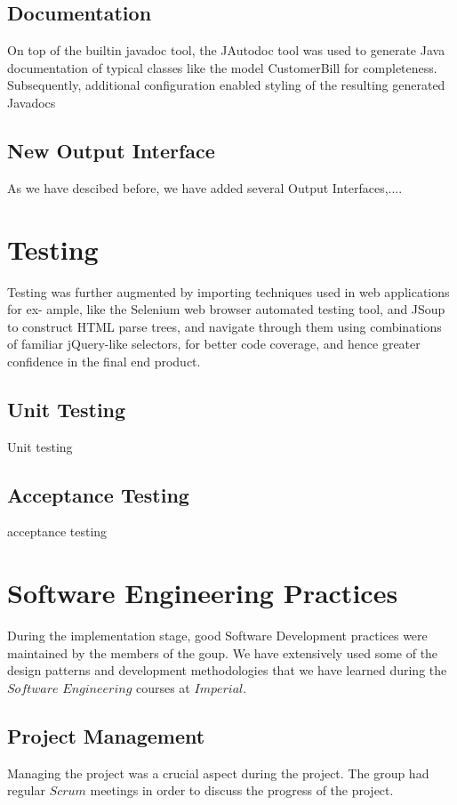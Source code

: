 \documentclass[11pt,twocolumn]{article} %
\begin{document}
\subsection{Documentation}
On top of the builtin javadoc tool, the JAutodoc tool was used to generate Java documentation of typical classes like the model CustomerBill for completeness.
Subsequently, additional configuration enabled styling of the resulting generated Javadocs

\subsection{New Output Interface}
As we have descibed before, we have added several Output Interfaces,....

\section{Testing}
Testing was further augmented by importing techniques used in web applications for ex-
ample, like the Selenium web browser automated testing tool, and JSoup to construct
HTML parse trees, and navigate through them using combinations of familiar jQuery-like
selectors, for better code coverage, and hence greater confidence in the final end product.

\subsection{Unit Testing}
Unit testing

\subsection{Acceptance Testing}
acceptance testing

\section{Software Engineering Practices}
During the implementation stage, good Software  Development practices were maintained by the members of the goup.
We have extensively used some of the design patterns and development methodologies that we have learned during the $Software$ 
$Engineering$ courses at $Imperial$.

\subsection{Project Management}
Managing the project was a crucial aspect during the project. The group had regular $Scrum$ meetings in order to discuss  
the progress of the project. 
\end{document}

